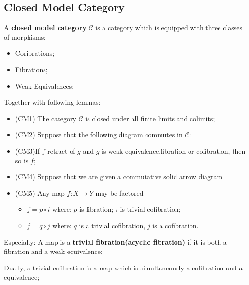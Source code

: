 \documentclass[Total.tex]{subfiles}
\begin{document}
			\subsection{Closed Model Category}
				\begin{Def}
					A \textbf{closed model category} $\mathcal{C}$ is a category which is equipped with three classes of morphisms:
					\begin{itemize}
						\item Coribrations;
						\item Fibrations;
						\item Weak Equivalences;
					\end{itemize}
					Together with following lemmas:
					\begin{itemize}
						\item (CM1) The category $\mathcal{C}$ is closed under \underline{all finite limits} and \underline{colimits};
						\item (CM2) Suppose that the following diagram commutes in $\mathcal{C}$:
						\begin{center}
						\end{center}
						\item (CM3)If $f$ retract of $g$ and $g$ is weak equivalence,fibration or cofibration, then so is $f$;
						\item (CM4) Suppose that we are given a commutative solid arrow diagram
						\begin{center}
						\end{center}
						\item (CM5) Any map $f:X\rightarrow Y$ may be factored
						\begin{itemize}
							\item $f=p\circ i$ where: $p$ is fibration; $i$ is trivial cofibration;
							\item $f=q\circ j$ where: $q$ is a trivial cofibration, $j$ is a cofibration.
						\end{itemize}
					\end{itemize}
					
					Especially: A map is a \textbf{trivial fibration(acyclic fibration)} if it is both a fibration and a weak equivalence;
					
					Dually, a trivial cofibration is a map which is simultaneously a cofibration and a equivalence;
				\end{Def}
\end{document}
